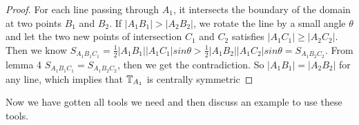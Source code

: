	
\begin{proof}
	For each line passing through $A_1$, it intersects the boundary 
	of the domain at two points $B_1$ and $B_2$. If $|A_1B_1| > |A_2B_2|$, 
	we rotate the line  by  a small angle $\theta$ and let the two new 
	points of intersection $C_1$ and $C_2$ satisfies $|A_1C_1| \geq |A_2C_2|$. 
	Then we know  $S_{A_1B_1C_1} = \frac{1}{2}|A_1B_1||A_1C_1|sin\theta >  \frac{1}{2}|A_1B_2||A_1C_2|sin\theta = S_{A_1B_2C_2}$. From lemma 4
	$S_{A_1B_1C_1}=S_{A_1B_2C_2}$, then we get the 
	contradiction. So $|A_1B_1|=|A_2B_2|$ for any line, 
	which implies that $\mathbb{T}_{A_1}$ is centrally symmetric
\end{proof}
	
Now we have gotten all tools we need and then discuss an example
to use these tools.
	